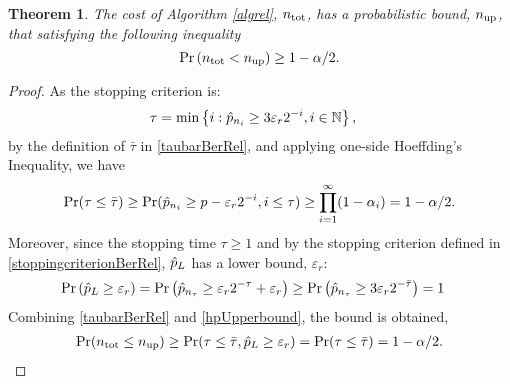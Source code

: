 \documentclass{iitthesis}
\newtheorem{theorem}{Theorem}[section]
\theoremstyle{definition}
\begin{document}
\begin{theorem} \label{costupperboundrel}
The cost of Algorithm \ref{algrel}, $n_{\operatorname{tot}}$,  has a probabilistic bound, $n_{\operatorname{up}}$, that satisfying the following inequality
\begin{equation}
\Pr\left(n_{\operatorname{tot}}<n_{\operatorname{up}}\right) \geq 1-\alpha/2.
\end{equation}
\end{theorem}
\begin{proof}
As the stopping criterion is: 
\begin{align*}
\tau &= \min\left\{i: \hat{p}_{n_i}\geq 3\varepsilon_r 2^{-i}, i \in \mathbb{N} \right \},
\end{align*}
by the definition of $\bar{\tau}$ in \eqref{taubarBerRel}, and applying one-side Hoeffding's Inequality, we have
\begin{align} \label{tauboundBerRel}
\Pr (\tau \leq \bar{\tau}) \geq \Pr (\hat{p}_{n_i} \geq  p-\varepsilon_r2^{-i}, i \leq \tau )
\geq \prod_{i=1}^\infty(1-\alpha_i) = 1-\alpha/2.
\end{align}
Moreover, since the stopping time $\tau \geq 1$ and by the stopping criterion defined in \eqref{stoppingcriterionBerRel}, $\hat{p}_L$ has a lower bound, $\varepsilon_r$:
\begin{align}\label{hpUpperbound}
\Pr\left(\hat{p}_L  \geq  \varepsilon_r \right)& = \Pr\left(\hat{p}_{n_\tau} \geq \varepsilon_r 2^{-\tau}+\varepsilon_r  \right) \geq \Pr\left(\hat{p}_{n_{\tau}}\geq 3\varepsilon_r2^{-{\bar{\tau}}}\right) =1
\end{align}
Combining \eqref{taubarBerRel} and \eqref{hpUpperbound}, the bound is obtained,
\begin{align*}
\Pr(n_{\operatorname{tot}} \leq n_{\operatorname{up}})  \geq \Pr(\tau \leq \bar{\tau}, \hat{p}_L \geq \varepsilon_r) =  \Pr(\tau \leq \bar{\tau}) =1-\alpha/2.
\end{align*}
\end{proof}
\end{document}
